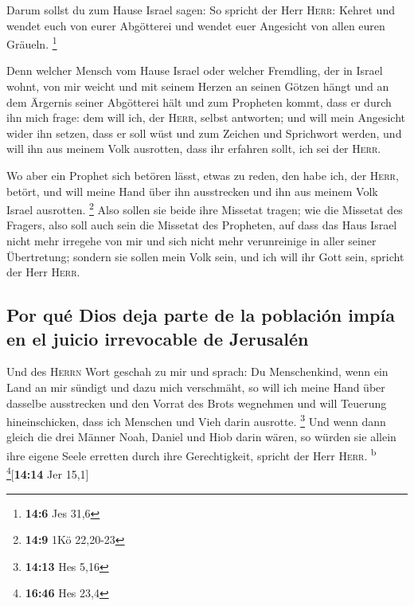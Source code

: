  Darum sollst du zum Hause Israel sagen: So spricht der
Herr \textsc{Herr}: Kehret und wendet euch von eurer Abgötterei und
wendet euer Angesicht von allen euren Gräueln. \footnote{\textbf{14:6}
  Jes 31,6}

 Denn welcher Mensch vom Hause Israel oder welcher
Fremdling, der in Israel wohnt, von mir weicht und mit seinem Herzen an
seinen Götzen hängt und an dem Ärgernis seiner Abgötterei hält und zum
Propheten kommt, dass er durch ihn mich frage: dem will ich, der
\textsc{Herr}, selbst antworten;  und will mein Angesicht
wider ihn setzen, dass er soll wüst und zum Zeichen und Sprichwort
werden, und will ihn aus meinem Volk ausrotten, dass ihr erfahren sollt,
ich sei der \textsc{Herr}.

 Wo aber ein Prophet sich betören lässt, etwas zu reden,
den habe ich, der \textsc{Herr}, betört, und will meine Hand über ihn
ausstrecken und ihn aus meinem Volk Israel ausrotten. \footnote{\textbf{14:9}
  1Kö 22,20-23}  Also sollen sie beide ihre Missetat
tragen; wie die Missetat des Fragers, also soll auch sein die Missetat
des Propheten,  auf dass das Haus Israel nicht mehr
irregehe von mir und sich nicht mehr verunreinige in aller seiner
Übertretung; sondern sie sollen mein Volk sein, und ich will ihr Gott
sein, spricht der Herr \textsc{Herr}.

\hypertarget{por-quuxe9-dios-deja-parte-de-la-poblaciuxf3n-impuxeda-en-el-juicio-irrevocable-de-jerusaluxe9n}{%
\subsection{Por qué Dios deja parte de la población impía en el juicio
irrevocable de
Jerusalén}\label{por-quuxe9-dios-deja-parte-de-la-poblaciuxf3n-impuxeda-en-el-juicio-irrevocable-de-jerusaluxe9n}}

 Und des \textsc{Herrn} Wort geschah zu mir und sprach:
 Du Menschenkind, wenn ein Land an mir sündigt und dazu
mich verschmäht, so will ich meine Hand über dasselbe ausstrecken und
den Vorrat des Brots wegnehmen und will Teuerung hineinschicken, dass
ich Menschen und Vieh darin ausrotte. \footnote{\textbf{14:13} Hes 5,16}
 Und wenn dann gleich die drei Männer Noah, Daniel und
Hiob darin wären, so würden sie allein ihre eigene Seele erretten durch
ihre Gerechtigkeit, spricht der Herr \textsc{Herr}. \textsuperscript{b}
\footnote{\textbf{16:46} Hes 23,4}{[}\textbf{14:14} Jer 15,1{]}

